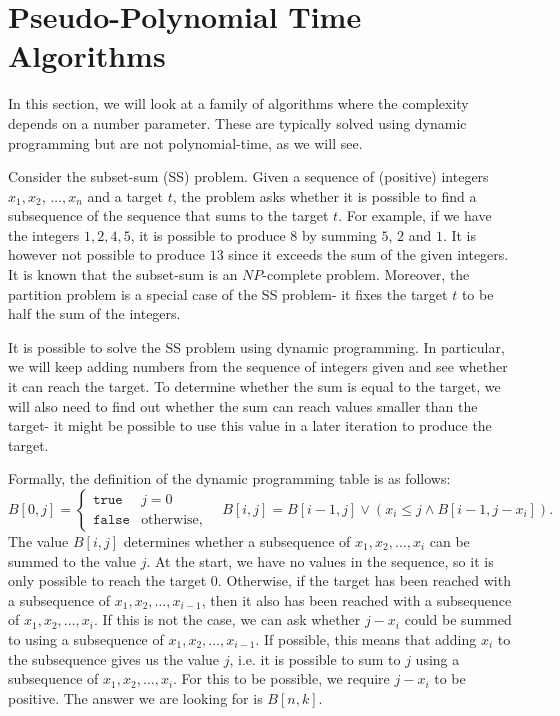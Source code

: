 \documentclass[a4paper, openany]{memoir}
\begin{document}
    \newpage

    \section{Pseudo-Polynomial Time Algorithms}
    In this section, we will look at a family of algorithms where the complexity depends on a number parameter. These are typically solved using dynamic programming but are not polynomial-time, as we will see.

    Consider the subset-sum (SS) problem. Given a sequence of (positive) integers $x_1, x_2$, $\dots, x_n$ and a target $t$, the problem asks whether it is possible to find a subsequence of the sequence that sums to the target $t$. For example, if we have the integers $1, 2, 4, 5$, it is possible to produce 8 by summing $5$, $2$ and $1$. It is however not possible to produce $13$ since it exceeds the sum of the given integers. It is known that the subset-sum is an $NP$-complete problem. Moreover, the partition problem is a special case of the SS problem- it fixes the target $t$ to be half the sum of the integers.

    It is possible to solve the SS problem using dynamic programming. In particular, we will keep adding numbers from the sequence of integers given and see whether it can reach the target. To determine whether the sum is equal to the target, we will also need to find out whether the sum can reach values smaller than the target- it might be possible to use this value in a later iteration to produce the target.
    
    Formally, the definition of the dynamic programming table is as follows:
    \[B[0, j] = \begin{cases}
        \texttt{true} & j = 0 \\
        \texttt{false} & \textrm{otherwise},
    \end{cases} \quad B[i, j] = B[i-1, j] \lor (x_i \leq j \land B[i-1, j-x_i]).\]
    The value $B[i, j]$ determines whether a subsequence of $x_1, x_2, \dots, x_i$ can be summed to the value $j$. At the start, we have no values in the sequence, so it is only possible to reach the target $0$. Otherwise, if the target has been reached with a subsequence of $x_1, x_2, \dots, x_{i-1}$, then it also has been reached with a subsequence of $x_1, x_2, \dots, x_i$. If this is not the case, we can ask whether $j - x_i$ could be summed to using a subsequence of $x_1, x_2, \dots, x_{i-1}$. If possible, this means that adding $x_i$ to the subsequence gives us the value $j$, i.e. it is possible to sum to $j$ using a subsequence of $x_1, x_2, \dots, x_i$. For this to be possible, we require $j - x_i$ to be positive. The answer we are looking for is $B[n, k]$.
\end{document}
